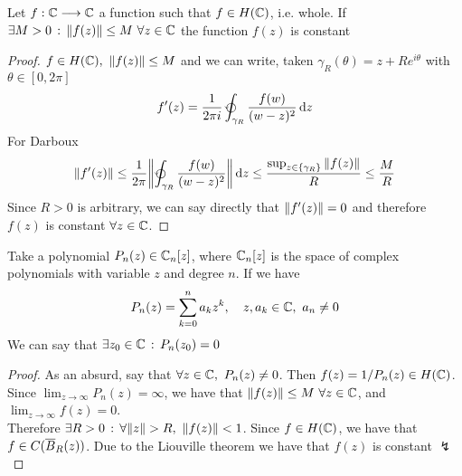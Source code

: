 \documentclass[../complete.tex]{subfiles}
\begin{document}
					\begin{thm}[Liouville]
						Let $f:\mathbb{C}\overset{}{\longrightarrow}\mathbb{C}$ a function such that $f\in H(\mathbb{C})$, i.e. whole. If $\exists M>0\, :\, \norm{f(z)}\le M\ \forall z\in\mathbb{C}$ the function $f(z)$ is constant
					\end{thm}
					\begin{proof}
						$f\in H(\Cf),\ \norm{f(z)}\le M$ and we can write, taken $\gamma_R(\theta)=z+Re^{i\theta}$ with $\theta\in[0,2\pi]$
	\begin{equation*}
		f'(z)=\frac{1}{2\pi i}\ointccw_{\gamma_R}\frac{f(w)}{(w-z)^2}\diff z
	\end{equation*}
	For Darboux
	\begin{equation*}
		\norm{f'(z)}\le\frac{1}{2\pi}\norm{\ointccw_{\gamma_R}\frac{f(w)}{(w-z)^2}}\diff z\le\frac{\sup_{z\in\{\gamma_R\}}\norm{f(z)}}{R}\le\frac{M}{R}
	\end{equation*}
	Since $R>0$ is arbitrary, we can say directly that $\norm{f'(z)}=0$ and therefore $f(z)$ is constant $\forall z\in\mathbb{C}$.
\end{proof}
\begin{thm}
	Take a polynomial $P_n(z)\in\mathbb{C}_n[z]$, where $\mathbb{C}_n[z]$ is the space of complex polynomials with variable $z$ and degree $n$. If we have
	\begin{equation*}
		P_n(z)=\sum_{k=0}^na_kz^k,\quad z,a_k\in\mathbb{C},\ a_n\ne0
	\end{equation*}
	We can say that $\exists z_0\in\mathbb{C}\, :\,  P_n(z_0)=0$
\end{thm}
\begin{proof}
	As an absurd, say that $\forall z\in\mathbb{C},\ P_n(z)\ne0$. Then $f(z)=1/P_n(z)\in H(\mathbb{C})$.\\
	Since $\lim_{z\to\infty}P_n(z)=\infty$, we have that $\norm{f(z)}\le M\ \forall z\in\mathbb{C}$, and $\lim_{z\to\infty}f(z)=0$.\\
	Therefore $\exists R>0\, :\, \forall\norm{z}>R,\ \norm{f(z)}<1$. Since $f\in H(\mathbb{C})$, we have that $f\in C(\overline{B}_R(z))$. Due to the Liouville theorem we have that $f(z)$ is constant $\lightning$
\end{proof}
\end{document}
